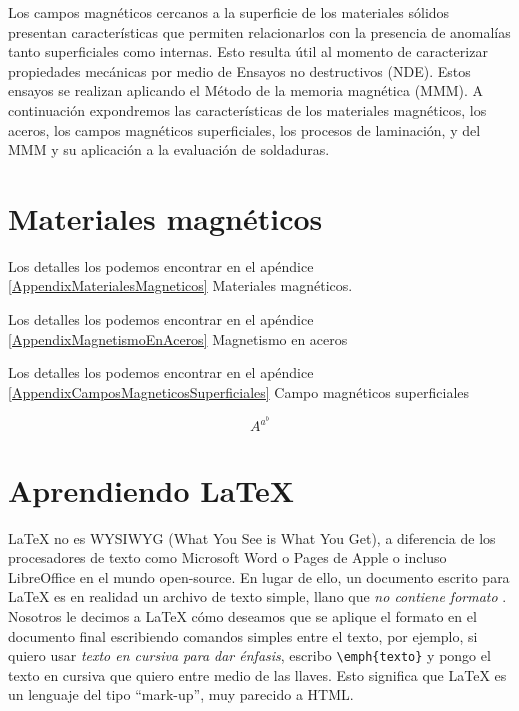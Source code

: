 Los campos magnéticos cercanos a la superficie de los materiales sólidos presentan características que permiten relacionarlos con la presencia de anomalías tanto superficiales como internas. Esto resulta útil al momento de caracterizar propiedades mecánicas por medio de Ensayos no destructivos (NDE). Estos ensayos se realizan aplicando el Método de la memoria magnética (MMM). A continuación expondremos las características de los materiales magnéticos, los aceros, los campos magnéticos superficiales, los procesos de laminación, y del MMM y su aplicación a la evaluación de soldaduras.


\section{Materiales magnéticos}
Los detalles los podemos encontrar en el apéndice \ref{AppendixMaterialesMagneticos} Materiales magnéticos.

Los detalles los podemos encontrar en el apéndice \ref{AppendixMagnetismoEnAceros} Magnetismo en aceros

Los detalles los podemos encontrar en el apéndice \ref{AppendixCamposMagneticosSuperficiales} Campo magnéticos superficiales











\[
A^{a^b}
\]












\section{Aprendiendo \LaTeX{}}

\LaTeX{} no es \textsc{WYSIWYG} (What You See is What You Get), a diferencia de los procesadores de texto como Microsoft Word o Pages de Apple o incluso LibreOffice en el mundo open-source. En lugar de ello, un documento escrito para \LaTeX{} es en realidad un archivo de texto simple, llano que \emph{no contiene formato} . Nosotros le decimos a \LaTeX{} cómo deseamos que se aplique el formato en el documento final escribiendo comandos simples entre el texto, por ejemplo, si quiero usar \emph{texto en cursiva para dar énfasis}, escribo \verb|\emph{texto}| y pongo el texto en cursiva que quiero entre medio de las llaves. Esto significa que \LaTeX{} es un lenguaje del tipo \enquote{mark-up}, muy parecido a HTML.

